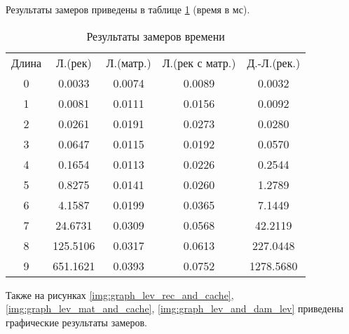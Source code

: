 Результаты замеров приведены в таблице \ref{tbl:time_mes} (время в мс).

\begin{table}[h]
    \begin{center}
        \begin{threeparttable}
        \captionsetup{justification=raggedleft,singlelinecheck=off}
        \caption{Результаты замеров времени}
        \label{tbl:time_mes}
        \begin{tabular}{|c|c|c|c|c|}
            \hline
            Длина & Л.(рек) & Л.(матр.)& Л.(рек с матр.) & Д.-Л.(рек.)  \\
            0 & 0.0033 & 0.0074 & 0.0089 & 0.0032 \\ 
            \hline
            1 & 0.0081 & 0.0111 & 0.0156 & 0.0092 \\ 
            \hline
            2 & 0.0261 & 0.0191 & 0.0273 & 0.0280 \\ 
            \hline
            3 & 0.0647 & 0.0115 & 0.0192 & 0.0570 \\ 
            \hline
            4 & 0.1654 & 0.0113 & 0.0226 & 0.2544 \\ 
            \hline
            5 & 0.8275 & 0.0141 & 0.0260 & 1.2789 \\ 
            \hline
            6 & 4.1587 & 0.0199 & 0.0365 & 7.1449 \\ 
            \hline
            7 & 24.6731 & 0.0309 & 0.0568 & 42.2119 \\ 
            \hline
            8 & 125.5106 & 0.0317 & 0.0613 & 227.0448 \\ 
            \hline
            9 & 651.1621 & 0.0393 & 0.0752 & 1278.5680 \\ 
            \hline
		\end{tabular}
    \end{threeparttable}
\end{center}
\end{table}

Также на рисунках \ref{img:graph_lev_rec_and_cache}, \ref{img:graph_lev_mat_and_cache}, \ref{img:graph_lev_and_dam_lev} приведены графические результаты замеров.

\clearpage


